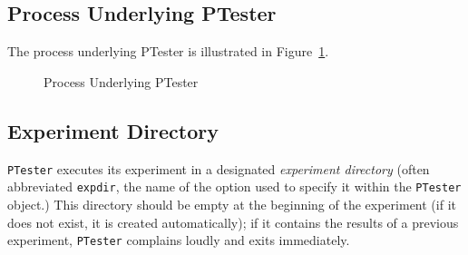 \documentclass[11pt]{book}
\begin{document}
\subsection{Process Underlying PTester}

The process underlying PTester is illustrated in
Figure~\ref{fig:ptesterprocess}.

\begin{figure}
  \centering
  \caption{Process Underlying PTester}
  \label{fig:ptesterprocess}
\end{figure}

\subsection{Experiment Directory}

\verb|PTester| executes its experiment in a designated \emph{experiment
  directory} (often abbreviated \verb|expdir|, the name of the option used
to specify it within the \verb|PTester| object.)  This directory should be
empty at the beginning of the experiment (if it does not exist, it is
created automatically); if it contains the results of a previous
experiment, \verb|PTester| complains loudly and exits immediately.
\end{document}
